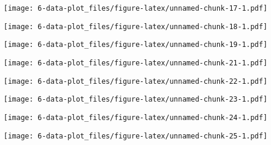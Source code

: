 \documentclass[
]{article}
\begin{document}
\texttt{[image: 6-data-plot\_files/figure-latex/unnamed-chunk-17-1.pdf]}

\texttt{[image: 6-data-plot\_files/figure-latex/unnamed-chunk-18-1.pdf]}

\texttt{[image: 6-data-plot\_files/figure-latex/unnamed-chunk-19-1.pdf]}

\texttt{[image: 6-data-plot\_files/figure-latex/unnamed-chunk-21-1.pdf]}

\texttt{[image: 6-data-plot\_files/figure-latex/unnamed-chunk-22-1.pdf]}

\texttt{[image: 6-data-plot\_files/figure-latex/unnamed-chunk-23-1.pdf]}

\texttt{[image: 6-data-plot\_files/figure-latex/unnamed-chunk-24-1.pdf]}

\texttt{[image: 6-data-plot\_files/figure-latex/unnamed-chunk-25-1.pdf]}
\end{document}
